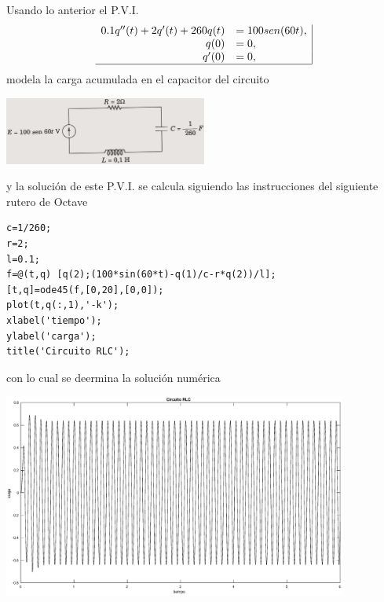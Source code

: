 \documentclass[letter,11pt]{article}
\newcommand{\octave}{{\sc Octave} }
\begin{document}
Usando lo anterior el P.V.I.
$$
\begin{array}{rl|}
0.1 q''(t)+2 q'(t) + 260q(t) &=100 sen(60t),\\
q(0) & =0,\\
q'(0) & =0,\\\hline
\end{array}
$$
modela la carga acumulada en el capacitor del circuito
\begin{center}
\includegraphics[width=0.5\textwidth]{ejerlc.eps}
\end{center}
y la soluci\'on de este P.V.I. se calcula siguiendo las instrucciones del siguiente rutero de \octave 
\begin{lstlisting}
c=1/260;
r=2;
l=0.1;
f=@(t,q) [q(2);(100*sin(60*t)-q(1)/c-r*q(2))/l];
[t,q]=ode45(f,[0,20],[0,0]);
plot(t,q(:,1),'-k');
xlabel('tiempo');
ylabel('carga');
title('Circuito RLC');
\end{lstlisting}
con lo cual se deermina la soluci\'on num\'erica
\begin{center}
\includegraphics[width=0.85\textwidth]{eje6.eps}
\end{center}

\end{document}
